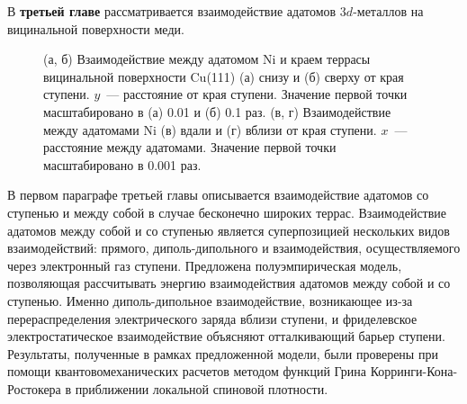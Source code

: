 \documentclass[10pt]{book}
\begin{document}
В \textbf{третьей главе} рассматривается взаимодействие адатомов $3d$-металлов на вицинальной поверхности меди.

\begin{figure}[t]
	\centering
	\caption{
		(а, б) Взаимодействие между адатомом Ni и краем террасы вицинальной поверхности Cu(111) (а) снизу и (б) сверху от края ступени. $y$~--- расстояние от края ступени. Значение первой точки масштабировано в (а) 0.01 и (б) 0.1 раз.
		(в, г) Взаимодействие между адатомами Ni (в) вдали и (г) вблизи от края ступени. $x$~--- расстояние между адатомами. Значение первой точки масштабировано в 0.001 раз.}
	\label{fig:mplb2016-23}
\end{figure}

В первом параграфе третьей главы описывается взаимодействие адатомов со ступенью и между собой в случае бесконечно широких террас. Взаимодействие адатомов между собой и со ступенью является суперпозицией нескольких видов взаимодействий: прямого, диполь-дипольного и взаимодействия, осуществляемого через электронный газ ступени. Предложена полуэмпирическая модель, позволяющая рассчитывать энергию взаимодействия адатомов между собой и со ступенью. Именно диполь-дипольное взаимодействие, возникающее из-за перераспределения электрического заряда вблизи ступени, и фриделевское электростатическое взаимодействие объясняют отталкивающий барьер ступени.
Результаты, полученные в рамках предложенной модели, были проверены при помощи квантовомеханических расчетов методом функций Грина Корринги-Кона-Ростокера в приближении локальной спиновой плотности.
\end{document}

